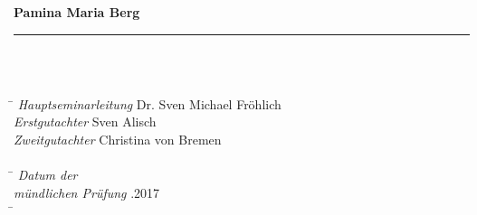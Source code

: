 \begin{titlepage}
\vspace*{15ex}
	\noindent \textbf{Pamina Maria Berg}\\
	\noindent \rule{\textwidth}{0.4mm} 
	 \\	
	 \\
\vspace*{2.5ex}
\begin{tabbing}
\hspace{10em} \=  \kill
\emph{Hauptseminarleitung} \> Dr. Sven Michael Fröhlich \\
\emph{Erstgutachter} \> Sven Alisch \\
\emph{Zweitgutachter} \> Christina von Bremen \\
 \> \\
 \hspace{10em} \=  \kill
\emph{Datum der} \> \\
\emph{mündlichen Prüfung} .2017 \\
 \hspace{10em} \=  \kill
\end{tabbing}

\end{titlepage}
